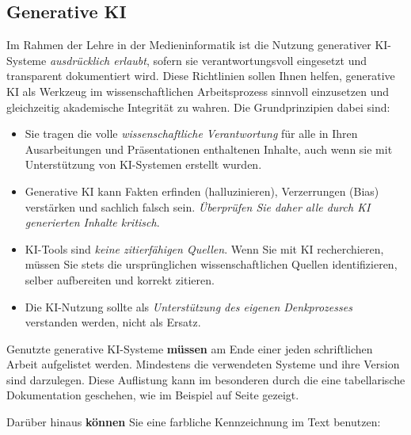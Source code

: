 \documentclass[12pt,        %
  english,ngerman,          %
  paper=a4,                 %
  captions=tablesignature,  %
  listof=numbered,          %
  bibliography=totoc,       %
  headings=small,           %
  headinclude=false,        %
  footinclude=false,        %
  parskip=half-,            %
  oneside,                  %
  DIV=12                    %
  ]{scrartcl}                %
\begin{document}
\subsection{Generative KI}

  
Im Rahmen der Lehre in der Medieninformatik ist die Nutzung generativer KI-Systeme \textit{ausdrücklich erlaubt}, sofern sie verantwortungsvoll eingesetzt und transparent dokumentiert wird. Diese Richtlinien sollen Ihnen helfen, generative KI als Werkzeug im wissenschaftlichen Arbeitsprozess sinnvoll einzusetzen und gleichzeitig akademische Integrität zu wahren. Die Grundprinzipien dabei sind:
    
\begin{itemize}
  \item Sie tragen die volle \textit{wissenschaftliche Verantwortung} für alle in Ihren Ausarbeitungen und Präsentationen enthaltenen Inhalte, auch wenn sie mit Unterstützung von KI-Systemen erstellt wurden.
  \item Generative KI kann Fakten erfinden (halluzinieren), Verzerrungen (Bias) verstärken und sachlich falsch sein. \textit{Überprüfen Sie daher alle durch KI generierten Inhalte kritisch}.    
  \item KI-Tools sind \textit{keine zitierfähigen Quellen}. Wenn Sie mit KI recherchieren, müssen Sie stets die ursprünglichen wissenschaftlichen Quellen identifizieren, selber aufbereiten und korrekt zitieren.
  \item Die KI-Nutzung sollte als \textit{Unterstützung des eigenen Denkprozesses} verstanden werden, nicht als Ersatz.
\end{itemize}

Genutzte generative KI-Systeme \textbf{müssen} am Ende einer jeden schriftlichen Arbeit aufgelistet werden. Mindestens die verwendeten Systeme und ihre Version sind darzulegen. Diese Auflistung kann im besonderen durch die eine tabellarische Dokumentation geschehen, wie im Beispiel auf Seite \pageref{sec:ai_use} gezeigt.

 
Darüber hinaus \textbf{können} Sie eine farbliche Kennzeichnung im Text benutzen:
  
\end{document}
